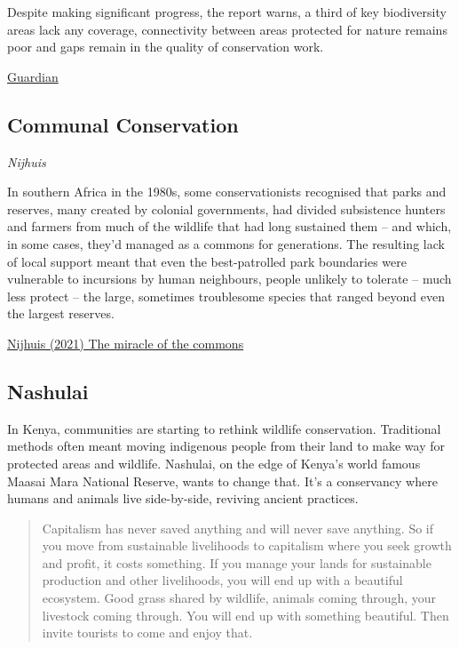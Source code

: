 \documentclass[
]{book}
\begin{document}
Despite making significant progress, the report warns, a third of key biodiversity areas lack any coverage, connectivity between areas protected for nature remains poor and gaps remain in the quality of conservation work.

\href{https://www.theguardian.com/environment/2021/may/19/governments-achieve-10-year-target-of-protecting-17-percent-land-aoe}{Guardian}

\hypertarget{communal-conservation}{%
\subsection{Communal Conservation}\label{communal-conservation}}

\emph{Nijhuis}

In southern Africa in the 1980s, some conservationists recognised that parks and reserves, many created by colonial governments, had divided subsistence hunters and farmers from much of the wildlife that had long sustained them -- and which, in some cases, they'd managed as a commons for generations. The resulting lack of local support meant that even the best-patrolled park boundaries were vulnerable to incursions by human neighbours, people unlikely to tolerate -- much less protect -- the large, sometimes troublesome species that ranged beyond even the largest reserves.

\href{The\%20miracle\%20of\%20the\%20commons}{Nijhuis (2021) The miracle of the commons}

\hypertarget{nashulai}{%
\subsection{Nashulai}\label{nashulai}}

In Kenya, communities are starting to rethink wildlife conservation. Traditional methods often meant moving indigenous people from their land to make way for protected areas and wildlife.
Nashulai, on the edge of Kenya's world famous Maasai Mara National Reserve, wants to change that. It's a conservancy where humans and animals live side-by-side, reviving ancient practices.

\begin{quote}
Capitalism has never saved anything and will never save anything.
So if you move from sustainable livelihoods to capitalism where you seek growth and profit,
it costs something. If you manage your lands for sustainable production and other livelihoods,
you will end up with a beautiful ecosystem. Good grass shared by wildlife,
animals coming through, your livestock coming through.
You will end up with something beautiful.
Then invite tourists to come and enjoy that.
\end{quote}
\end{document}
